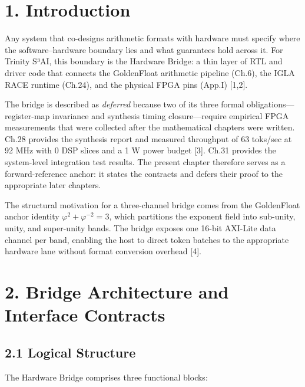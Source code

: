 \section{1. Introduction}\label{fa_12:introduction}

Any system that co-designs arithmetic formats with
hardware must specify where the software--hardware
boundary lies and what guarantees hold across it.
For Trinity S³AI, this boundary is the Hardware
Bridge: a thin layer of RTL and driver code that
connects the GoldenFloat arithmetic pipeline
(Ch.6), the IGLA RACE runtime (Ch.24), and the
physical FPGA pins (App.I) [1,2].

The bridge is described as \emph{deferred} because
two of its three formal obligations---register-map
invariance and synthesis timing closure---require
empirical FPGA measurements that were collected
after the mathematical chapters were written.
Ch.28 provides the synthesis report and measured
throughput of 63 toks/sec at 92 MHz with 0 DSP
slices and a 1 W power budget [3]. Ch.31
provides the system-level integration test
results. The present chapter therefore serves as a
forward-reference anchor: it states the contracts
and defers their proof to the appropriate later
chapters.

The structural motivation for a three-channel
bridge comes from the GoldenFloat anchor identity
\(\varphi^2 + \varphi^{-2} = 3\), which partitions
the exponent field into sub-unity, unity, and
super-unity bands. The bridge exposes one 16-bit
AXI-Lite data channel per band, enabling the host
to direct token batches to the appropriate
hardware lane without format conversion overhead
[4].

\section{2. Bridge Architecture and Interface
Contracts}\label{fa_12:bridge-architecture-and-interface-contracts}

\subsection{2.1 Logical
Structure}\label{fa_12:logical-structure}

The Hardware Bridge comprises three functional
blocks:

